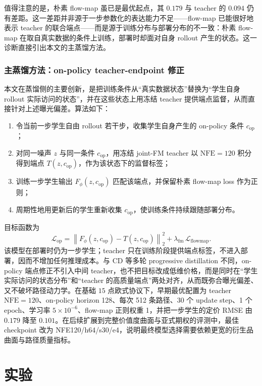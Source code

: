 \documentclass[11pt]{ctexart}
\newcommand{\nfe}{\mathrm{NFE}}
\begin{document}
值得注意的是，朴素 flow-map 虽已是最优起点，其 $0.179$ 与 teacher 的 $0.094$ 仍有差距。这一差距并非源于一步参数化的表达能力不足——flow-map 已能很好地表示 teacher 的联合端点——而是源于训练分布与部署分布的不一致：朴素 flow-map 在取自真实数据的条件上训练，部署时却面对自身 rollout 产生的状态。这一诊断直接引出本文的主蒸馏方法。

\subsubsection{主蒸馏方法：on-policy teacher-endpoint 修正}
\label{sec:onpolicy_method}
本文在蒸馏侧的主要创新，是把训练条件从“真实数据状态”替换为“学生自身 rollout 实际访问的状态”，并在这些状态上用冻结 teacher 提供端点监督，从而直接针对上述曝光偏差。算法如下：
\begin{enumerate}\itemsep2pt
\item 令当前一步学生自由 rollout 若干步，收集学生自身产生的 on-policy 条件 $c_{\mathrm{op}}$；
\item 对同一噪声 $z$ 与同一条件 $c_{\mathrm{op}}$，用冻结 joint-FM teacher 以 $\nfe{=}120$ 积分得到端点 $T(z,c_{\mathrm{op}})$，作为该状态下的监督标签；
\item 训练一步学生输出 $F_\phi(z,c_{\mathrm{op}})$ 匹配该端点，并保留朴素 flow-map loss 作为正则；
\item 周期性地用更新后的学生重新收集 $c_{\mathrm{op}}$，使训练条件持续跟随部署分布。
\end{enumerate}
目标函数为
\begin{equation}
\mathcal L_{\mathrm{op}}
=\left\|F_\phi(z,c_{\mathrm{op}})-T(z,c_{\mathrm{op}})\right\|_2^2
+\lambda_{\mathrm{fm}}\,\mathcal L_{\mathrm{flowmap}} .
\end{equation}
该模型在部署时仍为一步学生；teacher 只在训练阶段提供端点标签，不进入部署，因而不增加任何推理成本。与 CD 等多轮 progressive distillation 不同，on-policy 端点修正不引入中间 teacher，也不把目标改成低维价格，而是同时在“学生实际访问的状态分布”和“teacher 的高质量端点”两处对齐，从而既弥合曝光偏差、又不破坏路径动力学。在基础 $15$ 点欧式协议下，早期最优配置为 teacher $\nfe{=}120$、on-policy horizon 128、每次 512 条路径、30 个 update step、1 个 epoch、学习率 $5\times10^{-6}$、flow-map 正则权重 1，并把一步学生的定价 RMSE 由 $0.179$ 降至 $0.101$。在后续扩展到完整价值度曲面与亚式期权的评测中，最佳 checkpoint 改为 NFE120/h64/s30/e4，说明最终模型选择需要依赖更宽的衍生品曲面与路径质量指标。

\section{实验}
\label{sec:results}
\end{document}
